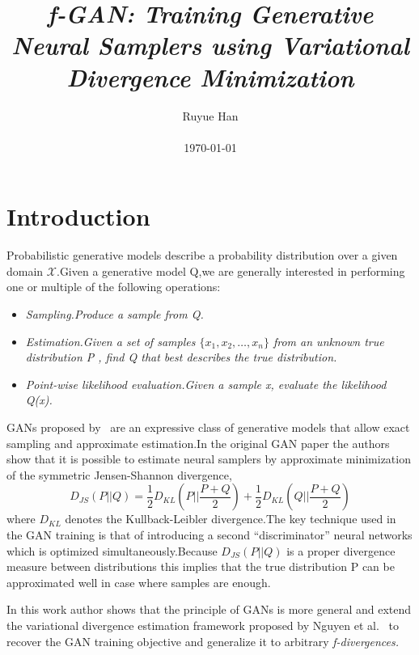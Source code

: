 \documentclass[10pt,letterpaper]{article}
\begin{document}
\title{\itshape f\upshape -GAN: Training Generative Neural Samplers using Variational Divergence Minimization}

\author{Ruyue Han\\\\ \today}

\maketitle

\section{Introduction}
Probabilistic generative models describe a probability distribution over a given domain $\mathcal{X}$.Given a generative model Q,we are generally interested in
performing one or multiple of the following operations:\par
\begin{itemize}
\item \itshape Sampling.\upshape Produce a sample from Q.
\item \itshape Estimation.\upshape Given a set of samples $\{x_{1},x_{2},\dots,x_{n}\}$ from an unknown true distribution P , find Q that best describes the true distribution.
\item \itshape Point-wise likelihood evaluation.\upshape Given a sample x, evaluate the likelihood Q(x).
\end{itemize}\par
GANs proposed by~\cite{Generative_2014_1} are an expressive class of generative models that allow exact sampling and approximate estimation.In the original GAN paper the authors show that it is possible to estimate neural samplers by
approximate minimization of the symmetric Jensen-Shannon divergence,
\begin{equation}
D_{JS}(P||Q) = \frac{1}{2}D_{KL}(P||\frac{P+Q}{2})+\frac{1}{2}D_{KL}(Q||\frac{P+Q}{2})
\end{equation}
where $D_{KL}$ denotes the Kullback-Leibler divergence.The key technique used in the GAN training is that of introducing a second ``discriminator'' neural networks which is optimized simultaneously.Because $D_{JS}(P||Q)$ is a proper divergence measure between distributions this implies that the true distribution P can be approximated well in case where samples are enough.\par
In this work author shows that the principle of GANs is more general and extend the variational divergence estimation framework proposed by Nguyen et al.~\cite{Estimating_2010_2} to recover the GAN training objective and generalize it to arbitrary \itshape f-divergences.
\end{document}
